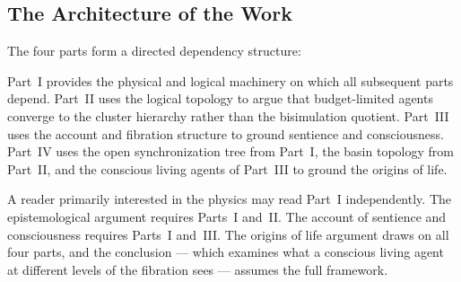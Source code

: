 \documentclass[12pt,openright,twoside]{book}
\theoremstyle{remark}
\theoremstyle{plain}
\theoremstyle{remark}
\theoremstyle{plain}
\theoremstyle{plain}
\begin{document}
\bigskip

\subsection*{The Architecture of the Work}

The four parts form a directed dependency structure:

\begin{center}
\end{center}

Part~I provides the physical and logical machinery on which all
subsequent parts depend.
Part~II uses the logical topology to argue that budget-limited
agents converge to the cluster hierarchy rather than the
bisimulation quotient.
Part~III uses the account and fibration structure to ground
sentience and consciousness.
Part~IV uses the open synchronization tree from Part~I, the basin
topology from Part~II, and the conscious living agents of Part~III
to ground the origins of life.

A reader primarily interested in the physics may read Part~I
independently.
The epistemological argument requires Parts~I and~II.
The account of sentience and consciousness requires Parts~I
and~III.
The origins of life argument draws on all four parts, and the
conclusion --- which examines what a conscious living agent at
different levels of the fibration sees --- assumes the full
framework.
\end{document}
